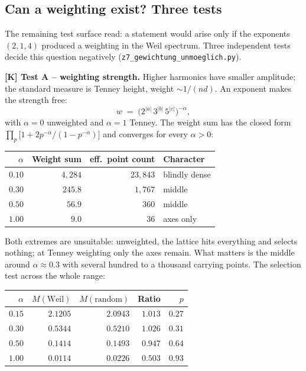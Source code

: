 \subsection{Can a weighting exist? Three tests}
\label{sec:gewichtung}

The remaining test surface read: a statement would arise only if the
exponents $(2,1,4)$ produced a weighting in the Weil spectrum. Three
independent tests decide this question negatively
(\texttt{z7\_gewichtung\_unmoeglich.py}).

\textbf{[K] Test A -- weighting strength.} Higher harmonics have
smaller amplitude; the standard measure is Tenney height, weight
$\sim 1/(nd)$. An exponent makes the strength free:
\[
  w \;=\; \bigl(2^{|a|}\,3^{|b|}\,5^{|c|}\bigr)^{-\alpha},
\]
with $\alpha = 0$ unweighted and $\alpha = 1$ Tenney. The weight sum has
the closed form $\prod_p \bigl[1 + 2p^{-\alpha}/(1-p^{-\alpha})\bigr]$
and converges for every $\alpha > 0$:

\begin{center}
\begin{tabular}{rrrl}
\toprule
$\alpha$ & Weight sum & eff.\ point count & Character \\
\midrule
$0.10$ & $4{,}284$ & $23{,}843$ & blindly dense \\
$0.30$ & $245.8$ & $1{,}767$ & middle \\
$0.50$ & $56.9$ & $360$ & middle \\
$1.00$ & $9.0$ & $36$ & axes only \\
\bottomrule
\end{tabular}
\end{center}

Both extremes are unsuitable: unweighted, the lattice hits everything
and selects nothing; at Tenney weighting only the axes remain. What
matters is the middle around $\alpha \approx 0.3$ with several hundred
to a thousand carrying points. The selection test across the whole
range:

\begin{center}
\begin{tabular}{rrrrr}
\toprule
$\alpha$ & $M(\text{Weil})$ & $M(\text{random})$ & Ratio & $p$ \\
\midrule
$0.15$ & $2.1205$ & $2.0943$ & $1.013$ & $0.27$ \\
$0.30$ & $0.5344$ & $0.5210$ & $1.026$ & $0.31$ \\
$0.50$ & $0.1414$ & $0.1493$ & $0.947$ & $0.64$ \\
$1.00$ & $0.0114$ & $0.0226$ & $0.503$ & $0.93$ \\
\bottomrule
\end{tabular}
\end{center}

